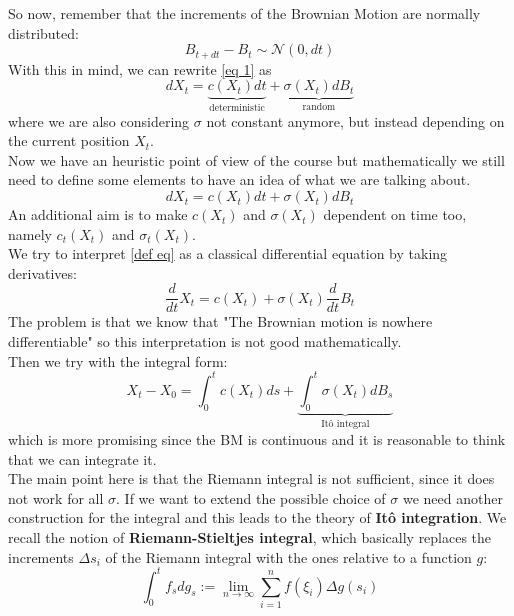 
So now, remember that the increments of the Brownian Motion are normally distributed:
\begin{equation*}
    B_{t+dt}-B_t \sim \mathcal{N}(0,dt)
\end{equation*}
With this in mind, we can rewrite \eqref{eq 1} as 
\begin{equation*}
    dX_t = \underbrace{c(X_t) dt}_{\text{deterministic}}  + \underbrace{\sigma(X_t) dB_t}_{\text{random}}
\end{equation*}
where we are also considering $\sigma$ not constant anymore, but instead depending on the current position $X_t$.\\
Now we have an heuristic point of view of the course but mathematically we still need to define some elements to have an idea of what we are talking about. 
\begin{equation}
\label{def eq}
    dX_t = c(X_t) dt + \sigma(X_t) dB_t
\end{equation}
An additional aim is to make $c(X_t)$ and $\sigma(X_t)$ dependent on time too, namely $c_t(X_t)$ and $\sigma_t(X_t)$. \\
We try to interpret \eqref{def eq} as a classical differential equation by taking derivatives:
\begin{equation*}
    \frac{d}{dt} X_t = c(X_t) + \sigma(X_t) \frac{d}{dt}B_t
\end{equation*}
The problem is that we know that "The Brownian motion is nowhere differentiable" so this interpretation is not good mathematically. \\
Then we try with the integral form:
\begin{equation*}
    X_t- X_0 = \int_0^t c(X_t) ds + \underbrace{\int_0^t \sigma(X_t) dB_s}_{\text{Itô integral}}
\end{equation*}
which is more promising since the BM is continuous and it is reasonable to think that we can integrate it. \\
The main point here is that the Riemann integral is not sufficient, since it does not work for all $\sigma$. If we want to extend the possible choice of $\sigma$ we need another construction for the integral and this leads to the theory of \textbf{Itô integration}. We recall the notion of \textbf{Riemann-Stieltjes integral}, which basically replaces the increments $\Delta s_i$ of the Riemann integral with the ones relative to a function $g$:
\begin{equation*}
    \int_0^t f_s dg_s := \lim_{n \to \infty} \sum_{i=1}^n f(\xi_i) \Delta g(s_i)
\end{equation*}
